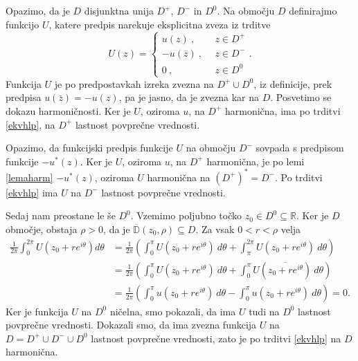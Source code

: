 \documentclass[mat1, tisk]{fmfdelo}
\begin{document}
    \begin{dokaz}
        Opazimo, da je $D$ disjunktna unija $D^+$, $D^-$ in $D^0$.
        Na območju $D$ definirajmo funkcijo $U$, katere predpis narekuje eksplicitna zveza iz trditve
        $$
        U(z) = 
        \begin{cases}
            u(z)~,~~&z \in D^{+}\\
            -u(\overline{z})~,~~&z \in D^{-}\\
            0~,~~ &z \in D^0
        \end{cases}
        .
        $$
        Funkcija $U$ je po predpostavkah izreka zvezna na $D^+ \cup D^0$, iz definicije, prek predpisa $u(\overline{z}) = - u(z)$, pa je jasno, da je zvezna kar na $D$. 
        Posvetimo se dokazu harmoničnosti.
        Ker je $U$, oziroma $u$, na $D^+$ harmonična, ima po trditvi \ref{ekvhlp}, na $D^+$ lastnost povprečne vrednosti. 

        Opazimo, da funkcijski predpis funkcije $U$ na območju $D^-$ sovpada s predpisom funkcije $- u^*(z)$. 
        Ker je $U$, oziroma $u$, na $D^+$ harmonična, je po lemi \ref{lemaharm} $-u^*(z)$, oziroma $U$ harmonična na $(D^+)^* = D^-$.
        Po trditvi \ref{ekvhlp} ima $U$ na $D^-$ lastnost povprečne vrednosti. 
        
        Sedaj nam preostane le še $D^0$.
        Vzemimo poljubno točko $z_0 \in D^0 \subseteq \mathbb{R}$. Ker je $D$ območje, obstaja $\rho > 0$, da je $\overline{\mathbb{D}}(z_0, \rho) \subseteq D$. Za vsak $0 < r < \rho$ velja
        \begin{align*}
            \frac{1}{2 \pi} \int_{0}^{2 \pi}{U(z_0 + re^{i \theta}) d\theta} &= \frac{1}{2 \pi} \left(\int_{0}^{\pi}U(z_0 + re^{i \theta})~d\theta + \int_{\pi}^{2\pi} U(z_0 + re^{i \theta})~d\theta\right) \\
            & = \frac{1}{2 \pi} \left(\int_{0}^{\pi}U(z_0 + re^{i \theta})~d\theta + \int_{0}^{\pi}U(\overline{z_0 + re^{i \theta}})~d\theta\right) \\
            &= \frac{1}{2 \pi} \left(\int_{0}^{\pi}u(z_0 + re^{i \theta})~d\theta - \int_{0}^{\pi}u(z_0 + re^{i \theta})~d\theta\right) = 0.
        \end{align*}        
        Ker je funkcija $U$ na $D^0$ ničelna, smo pokazali, da ima $U$ tudi na $D^0$ lastnost povprečne vrednosti. 
        Dokazali smo, da ima zvezna funkcija $U$ na $D = D^+ \cup D^- \cup D^0$ lastnost povprečne vrednosti, zato je po trditvi \ref{ekvhlp} na $D$ harmonična.
    \end{dokaz}
\end{document}
